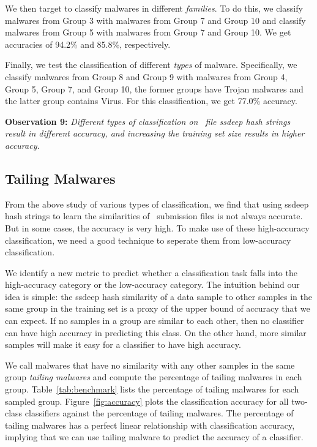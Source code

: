 We then target to classify malwares in different {\em families}.
To do this, we classify malwares from Group 3 with malwares from Group 7 and Group 10
and classify malwares from Group 5 with malwares from Group 7 and Group 10. 
We get accuracies of 94.2\% and 85.8\%, respectively. 

Finally, we test the classification of different {\em types} of malware.
Specifically, we classify malwares from Group 8 and Group 9 with malwares from Group 4, Group 5, Group 7, and Group 10, 
the former groups have Trojan malwares and the latter group contains Virus. 
For this classification, we get 77.0\% accuracy. 

{\bf Observation 9:}
{\em Different types of classification on \vt\ file ssdeep hash strings result in different accuracy, and increasing the training set size results in higher accuracy.}

\subsection{Tailing Malwares}
From the above study of various types of classification,
we find that using ssdeep hash strings to learn the similarities of \vt\ submission files 
is not always accurate.
But in some cases, the accuracy is very high.
To make use of these high-accuracy classification,
we need a good technique to seperate them from low-accuracy classification.

We identify a new metric to predict whether
a classification task falls into the
high-accuracy category or the low-accuracy
category. The intuition behind our idea is simple:
the ssdeep hash similarity of a data sample to other samples in the same group in
the training set is a proxy of the upper bound
of accuracy that we can expect. 
If no samples in a group are similar to each other, 
then no classifier can have high accuracy in predicting this class.
On the other hand, more similar samples will make it easy for a classifier to have high accuracy.

We call malwares that have no similarity with any other samples in the same group {\em tailing malwares}
and compute the percentage of tailing malwares in each group.
Table~\ref{tab:benchmark} lists the percentage of tailing malwares for each sampled group. 
Figure~\ref{fig:accuracy} plots the classification accuracy for all two-class classifiers against the percentage of tailing malwares.
The percentage of tailing malwares has a perfect linear relationship with classification accuracy,
implying that we can use tailing malware to predict the accuracy of a classifier.

